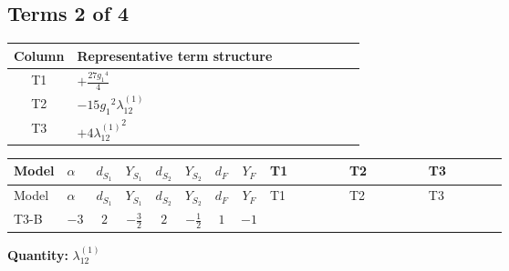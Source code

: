 \documentclass[8pt]{article}
\begin{document}
\begin{landscape}
\subsection*{Terms 2 of 4}
\begin{center}
\begin{tabular}{@{}c >{\raggedright\arraybackslash}p{0.82\linewidth}@{}}
\toprule
Column & Representative term structure \\
\midrule
T1 & \(\displaystyle +\frac{27 {g_1}^4}{4}\) \\
\midrule
T2 & \(\displaystyle -15 {g_1}^2 {\lambda_{12}^{(1)}}\) \\
\midrule
T3 & \(\displaystyle +4 {\lambda_{12}^{(1)}}^2\) \\
\midrule
\bottomrule
\end{tabular}
\end{center}
\smallskip
\tiny
\begin{longtable}{@{}llcccccc >{\raggedright\arraybackslash}p{0.21\linewidth} >{\raggedright\arraybackslash}p{0.21\linewidth} >{\raggedright\arraybackslash}p{0.21\linewidth}@{}}
\toprule
Model & $\alpha$ & $d_{S_1}$ & $Y_{S_1}$ & $d_{S_2}$ & $Y_{S_2}$ & $d_F$ & $Y_F$ & T1 & T2 & T3 \\
\midrule
\endfirsthead
\toprule
Model & $\alpha$ & $d_{S_1}$ & $Y_{S_1}$ & $d_{S_2}$ & $Y_{S_2}$ & $d_F$ & $Y_F$ & T1 & T2 & T3 \\
\midrule
\endhead
T3-B & $-3$ & $2$ & $-\frac{3}{2}$ & $2$ & $-\frac{1}{2}$ & $1$ & $-1$ & \scriptsize\adjustbox{max width=\linewidth}{$\begin{gathered} +\frac{27 {g_1}^4}{4}\end{gathered}$} & \scriptsize\adjustbox{max width=\linewidth}{$\begin{gathered} -15 {g_1}^2 {\lambda_{12}^{(1)}}\end{gathered}$} & \scriptsize\adjustbox{max width=\linewidth}{$\begin{gathered} +4 {\lambda_{12}^{(1)}}^2\end{gathered}$} \\
\midrule
\bottomrule
\end{longtable}
\clearpage
\noindent\textbf{Quantity: }$\lambda_{12}^{(1)}$\par\smallskip

\end{landscape}
\end{document}

